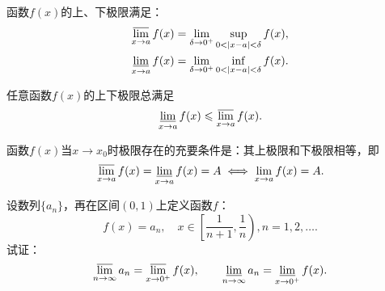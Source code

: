 \begin{property}
函数\(f(x)\)的上、下极限满足：\begin{gather}
\varlimsup\limits_{x \to a} f(x) = \lim\limits_{\delta\to0^+} \sup\limits_{0<\abs{x-a}<\delta} f(x), \\
\varliminf\limits_{x \to a} f(x) = \lim\limits_{\delta\to0^+} \inf\limits_{0<\abs{x-a}<\delta} f(x).
\end{gather}
\end{property}

\begin{theorem}
任意函数\(f(x)\)的上下极限总满足\[
\varliminf\limits_{x \to a} f(x) \leqslant \varlimsup\limits_{x \to a} f(x).
\]
\end{theorem}

\begin{theorem}
函数\(f(x)\)当\(x \to x_0\)时极限存在的充要条件是：其上极限和下极限相等，即\[
\varlimsup\limits_{x \to a} f(x) = \varliminf\limits_{x \to a} f(x) = A
\iff
\lim\limits_{x \to a} f(x) = A.
\]
\end{theorem}

\begin{example}
设数列\(\{a_n\}\)，再在区间\((0,1)\)上定义函数\(f\)：\[
f(x) = a_n, \quad x\in\left[\frac{1}{n+1},\frac{1}{n}\right), n=1,2,\dotsc.
\]试证：\[
\varlimsup\limits_{n\to\infty} a_n
= \varlimsup\limits_{x\to0^+} f(x),
\qquad
\varliminf\limits_{n\to\infty} a_n
= \varliminf\limits_{x\to0^+} f(x).
\]
\end{example}


